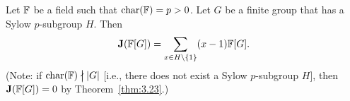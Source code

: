 
\lecture{}

\begin{proposition}\label{prop:4.19}
Let $\mathbb{F}$ be a field such that $\operatorname{char}(\mathbb{F})=p>0$. Let $G$ be a finite
group that has a Sylow $p$-subgroup $H$. Then
\begin{equation}
\operatorname{\textup{\textbf{J}}}(\mathbb{F}[G])=\sum_{x\in H\setminus\{1\}}(x-1)\mathbb{F}[G].
\end{equation}
(Note: if $\Char(\FF)\ndivides|G|$ [i.e., there does not exist a Sylow
  $p$-subgroup $H$], then $\operatorname{\textup{\textbf{J}}}(\mathbb{F}[G])=0$ by Theorem~\ref{thm:3.23}.)
\end{proposition}

